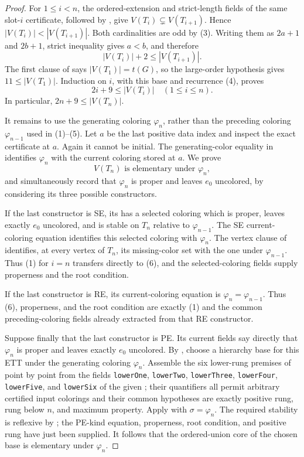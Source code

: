 \begin{proof}
For $1\leq i<n$, the ordered-extension and strict-length fields of the
same slot-$i$ certificate, followed by
, give
$V(T_i)\subsetneq V(T_{i+1})$.  Hence
$|V(T_i)|<|V(T_{i+1})|$.  Both cardinalities are odd by (3).  Writing
them as $2a+1$ and $2b+1$, strict inequality gives $a<b$, and therefore
\[
                         |V(T_i)|+2\leq|V(T_{i+1})|.            \tag{4}
\]
The first clause of  says
$|V(T_1)|=t(G)$, so the large-order hypothesis gives $11\leq|V(T_1)|$.
Induction on $i$, with this base and recurrence (4), proves
\[
                         2i+9\leq|V(T_i)|
       \quad(1\leq i\leq n).                                  \tag{5}
\]
In particular, $2n+9\leq|V(T_n)|$.

It remains to use the generating coloring $\varphi_n$, rather than the
preceding coloring $\varphi_{n-1}$ used in (1)--(5).  Let $a$ be the last
positive data index and inspect the exact certificate at $a$.  Again it
cannot be initial.  The generating-color equality in
 identifies $\varphi_n$ with the current
coloring stored at $a$.  We prove
\[
 V(T_n)\text{ is elementary under }\varphi_n,                 \tag{6}
\]
and simultaneously record that $\varphi_n$ is proper and leaves $e_0$
uncolored, by considering its three possible constructors.

If the last constructor is SE, its
 has a selected coloring which is proper,
leaves exactly $e_0$ uncolored, and is stable on $T_n$ relative to
$\varphi_{n-1}$.  The SE current-coloring equation identifies this
selected coloring with $\varphi_n$.  The vertex clause of
 identifies, at every vertex of $T_n$, its
missing-color set with the one under $\varphi_{n-1}$.  Thus (1) for
$i=n$ transfers directly to (6), and the selected-coloring fields supply
properness and the root condition.

If the last constructor is RE, its current-coloring equation is
$\varphi_n=\varphi_{n-1}$.  Thus (6), properness, and the root condition
are exactly (1) and the common preceding-coloring fields already
extracted from that RE constructor.

Suppose finally that the last constructor is PE.  Its current fields say
directly that $\varphi_n$ is proper and leaves exactly $e_0$ uncolored.
By , choose a hierarchy base for this ETT
under the generating coloring $\varphi_n$.  Assemble the six lower-rung
premises of  point by point from
the fields \texttt{lowerOne}, \texttt{lowerTwo}, \texttt{lowerThree},
\texttt{lowerFour}, \texttt{lowerFive}, and \texttt{lowerSix} of the
given ; their quantifiers all permit
arbitrary certified input colorings and their common hypotheses are
exactly positive rung, rung below $n$, and maximum property.  Apply
 with $\sigma=\varphi_n$.  The
required stability is reflexive by ; the PE-kind equation,
properness, root condition, and positive rung have just been supplied.
It follows that the ordered-union core of the chosen base is elementary
under $\varphi_n$.


\end{proof}
